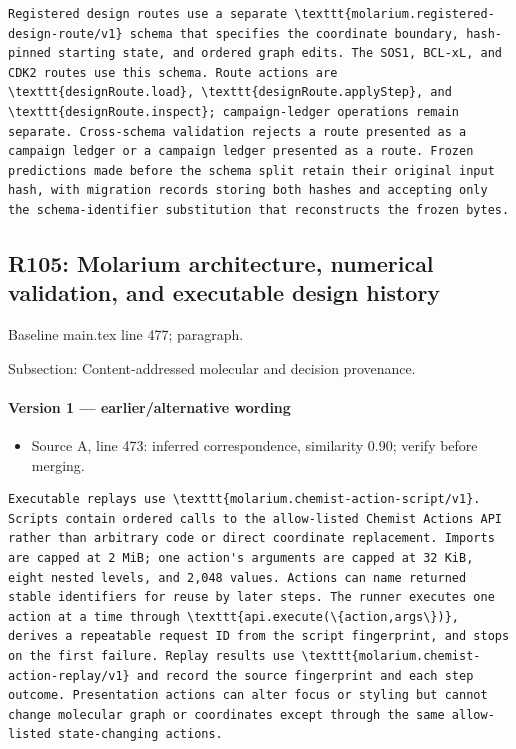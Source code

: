 \documentclass[11pt]{article}
\begin{document}
\begin{lstlisting}
Registered design routes use a separate \texttt{molarium.registered-design-route/v1} schema that specifies the coordinate boundary, hash-pinned starting state, and ordered graph edits. The SOS1, BCL-xL, and CDK2 routes use this schema. Route actions are \texttt{designRoute.load}, \texttt{designRoute.applyStep}, and \texttt{designRoute.inspect}; campaign-ledger operations remain separate. Cross-schema validation rejects a route presented as a campaign ledger or a campaign ledger presented as a route. Frozen predictions made before the schema split retain their original input hash, with migration records storing both hashes and accepting only the schema-identifier substitution that reconstructs the frozen bytes.
\end{lstlisting}

\subsection{R105: Molarium architecture, numerical validation, and executable design history}

Baseline main.tex line 477; paragraph.

Subsection: Content-addressed molecular and decision provenance.

\paragraph{Version 1 --- earlier/alternative wording}

\begin{itemize}[leftmargin=*]
\item Source A, line 473: inferred correspondence, similarity 0.90; verify before merging.
\end{itemize}

\begin{lstlisting}
Executable replays use \texttt{molarium.chemist-action-script/v1}. Scripts contain ordered calls to the allow-listed Chemist Actions API rather than arbitrary code or direct coordinate replacement. Imports are capped at 2 MiB; one action's arguments are capped at 32 KiB, eight nested levels, and 2,048 values. Actions can name returned stable identifiers for reuse by later steps. The runner executes one action at a time through \texttt{api.execute(\{action,args\})}, derives a repeatable request ID from the script fingerprint, and stops on the first failure. Replay results use \texttt{molarium.chemist-action-replay/v1} and record the source fingerprint and each step outcome. Presentation actions can alter focus or styling but cannot change molecular graph or coordinates except through the same allow-listed state-changing actions.
\end{lstlisting}
\end{document}
